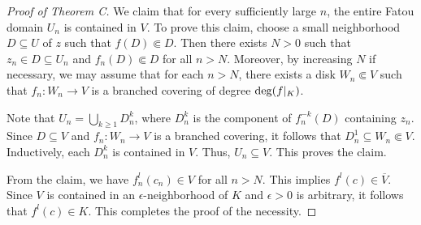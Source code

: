 \documentclass[a4paper,reqno,times, 11pt]{amsart}
\theoremstyle{remark}
\theoremstyle{plain}
\numberwithin{equation}{section}
\def\ov{\overline}
\begin{document}
\begin{proof}[Proof of Theorem C]
	We  claim that for every sufficiently large $n$, the entire Fatou domain $ U_n$ is contained in $V$. To prove this claim,  choose a small neighborhood $D\subseteq U$ of $z$ such that $f(D)\Subset D$. Then there exists $N>0$ such that $z_n\in D\subseteq  U_n$ and $f_n(D)\Subset D$ for all $n>N$. Moreover, by increasing $N$ if necessary, we may assume that for each $n>N$, there exists a disk $W_n\Subset V$ such that $f_n:W_n\to V$ is a branched covering of  degree ${\rm deg}(f|_K)$.
	
	Note that $ U_n=\bigcup_{k\geq1} D_n^k$, where $D_n^k$ is the component of $f^{-k}_n(D)$ containing $z_n$. Since $D\subseteq V$ and $f_n:W_n\to V$ is a branched covering, it follows that $D_n^1\subseteq W_n\Subset V$. Inductively, each $D_n^k$ is contained in $V$. Thus, $ U_n\subseteq V$. This proves the claim.
	
	From the claim, we have $f_n^l(c_n)\in V$ for all $n>N$. This implies $f^l(c)\in\ov{V}$. Since $V$ is contained in an $\epsilon$-neighborhood of $K$ and $\epsilon>0$ is arbitrary, it follows that $f^l(c)\in K$. This completes the proof of the necessity.
\end{proof}
\end{document}
